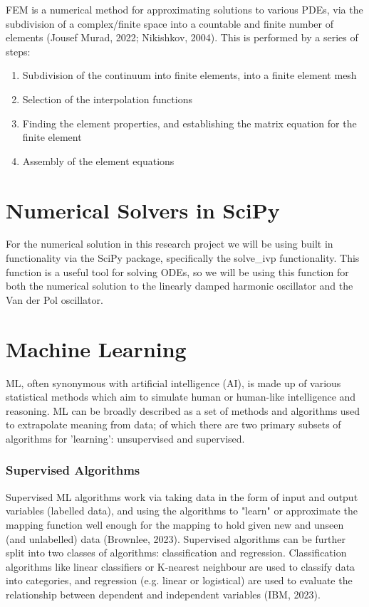 \documentclass[12pt, openany]{book}
\begin{document}
FEM is a numerical method for approximating solutions to various PDEs, via the subdivision of a complex/finite space into a countable and finite number of elements (Jousef Murad, 2022; Nikishkov, 2004). This is performed by a series of steps:

\begin{enumerate}
    \item Subdivision of the continuum into finite elements, into a finite element mesh
    \item Selection of the interpolation functions
    \item Finding the element properties, and establishing the matrix equation for the finite element
    \item Assembly of the element equations
\end{enumerate}

\section{Numerical Solvers in SciPy}

For the numerical solution in this research project we will be using built in functionality via the SciPy package, specifically the solve{\_}ivp functionality. This function is a useful tool for solving ODEs, so we will be using this function for both the numerical solution to the linearly damped harmonic oscillator and the Van der Pol oscillator.

\section{Machine Learning}

ML, often synonymous with artificial intelligence (AI), is made up of various statistical methods which aim to simulate human or human-like intelligence and reasoning. ML can be broadly described as a set of methods and algorithms used to extrapolate meaning from data; of which there are two primary subsets of algorithms for 'learning': unsupervised and supervised.

\subsubsection*{Supervised Algorithms}

Supervised ML algorithms work via taking data in the form of input and output variables (labelled data), and using the algorithms to "learn" or approximate the mapping function well enough for the mapping to hold given new and unseen (and unlabelled) data (Brownlee, 2023). Supervised algorithms can be further split into two classes of algorithms: classification and regression. Classification algorithms like linear classifiers or K-nearest neighbour are used to classify data into categories, and regression (e.g. linear or logistical) are used to evaluate the relationship between dependent and independent variables (IBM, 2023).
\end{document}
